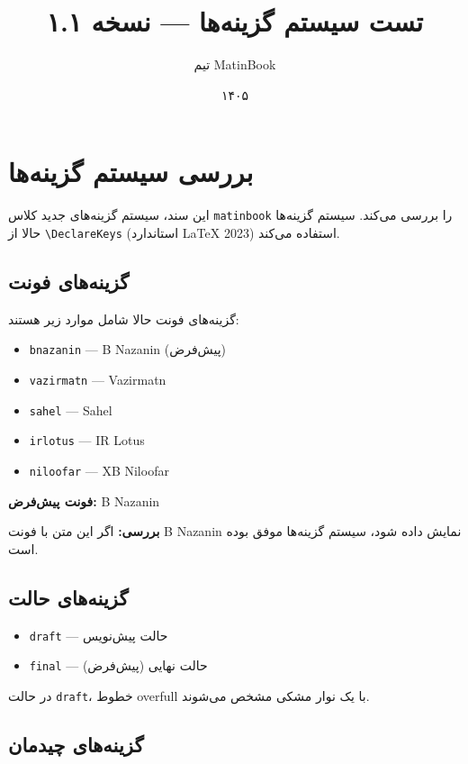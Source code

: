 \documentclass{matinbook}
\title{تست سیستم گزینه‌ها — نسخه ۱.۱}
\author{تیم MatinBook}
\date{۱۴۰۵}
\begin{document}
\maketitle

\chapter{بررسی سیستم گزینه‌ها}
\label{chap:test-options}

این سند، سیستم گزینه‌های جدید کلاس \verb|matinbook| را بررسی
می‌کند. سیستم گزینه‌ها حالا از \verb|\DeclareKeys| (استاندارد
LaTeX 2023) استفاده می‌کند.

\section{گزینه‌های فونت}
\label{sec:font-options}

گزینه‌های فونت حالا شامل موارد زیر هستند:

\begin{itemize}
    \item \verb|bnazanin| — B Nazanin (پیش‌فرض)
    \item \verb|vazirmatn| — Vazirmatn
    \item \verb|sahel| — Sahel
    \item \verb|irlotus| — IR Lotus
    \item \verb|niloofar| — XB Niloofar
\end{itemize}

\textbf{فونت پیش‌فرض:} B Nazanin

\textbf{بررسی:} اگر این متن با فونت B Nazanin نمایش داده شود،
سیستم گزینه‌ها موفق بوده است.

\section{گزینه‌های حالت}
\label{sec:mode-options}

\begin{itemize}
    \item \verb|draft| — حالت پیش‌نویس
    \item \verb|final| — حالت نهایی (پیش‌فرض)
\end{itemize}

در حالت \verb|draft|، خطوط overfull با یک نوار مشکی مشخص می‌شوند.

\section{گزینه‌های چیدمان}
\label{sec:layout-options}
\end{document}
